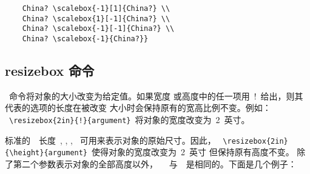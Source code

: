 \hspace{-1.5cm}\begin{minipage}[b]{.5\textwidth}
	\begin{center}
	\end{center}
	\par\vspace{0pt}
\end{minipage}%
\begin{minipage}[b]{.5\textwidth}
	\begin{Verbatim}
	China? \scalebox{-1}[1]{China?} \\
	China? \scalebox{1}[-1]{China?} \\
	China? \scalebox{-1}[-1]{China?} \\
	China? \scalebox{-1}{China?}}
	\end{Verbatim}
	\par\vspace{0pt}
\end{minipage}

\subsection{resizebox 命令}\label{ssec:resizebox}

{\large{}}

{\large{}}

~命令将对象的大小改变为给定值。如果{宽度}
或{高度}中的任一项用~!~给出，则其代表的选项的长度在被改变
大小时会保持原有的宽高比例不变。例如：
~\verb+\resizebox{2in}{!}{argument}+~将对象的宽度改变为~2~英寸。

标准的~\LaTeXe{}~长度~, , ,
~可用来表示对象的原始尺寸。因此，
~\verb+\resizebox{2in}{\height}{argument}+~使得对象的宽度改变为~2~英寸
但保持原有高度不变。 除了第二个参数表示对象的全部高度以外，
~~与~~是相同的。下面是几个例子：

